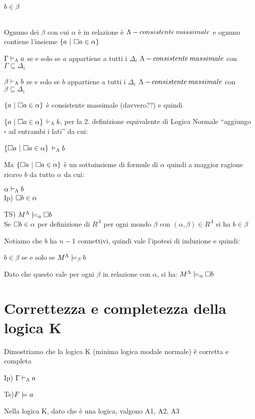 $b\in\beta$

 \\


Ognuno dei $\beta$ con cui $\alpha$ è in relazione è $\Lambda-consistente\: massimale$
e ognuno contiene l'insieme $\{a\ |\ \boa\in\alpha\}$ 

$\Gamma\vdash_{\Lambda}a$ se e solo se $a$ appartiene a tutti i $\Delta_{i}$
$\Lambda-consistente\: massimale$ con $\Gamma\subseteq\Delta_{i}$

$\beta\vdash_{\Lambda}b$ se e solo se $b$ appartiene a tutti i $\Delta_{i}$
$\Lambda-consistente\: massimale$ con $\beta\subseteq\Delta_{i}$

$\{a\ |\ \boa\in\alpha\}$ è consistente massimale (davvero??) e quindi

$\{a\ |\ \boa\in\alpha\}$ $\vdash_{\Lambda}b$, per la 2. definizione equivalente
di Logica Normale ``aggiungo $\square$ ad entrambi i lati'' da
cui:

$\{\square a\ |\ \square a\in\alpha\}$ $\vdash_{\Lambda}b$

Ma $\{\square a\ |\ \square a\in\alpha\}$ è un sottoinsieme di formule di $\alpha$
quindi a maggior ragione ricavo $b$ da tutto $\alpha$ da cui:

$\alpha\vdash_{\Lambda}b$\\
Ip) $\square b\in\alpha$

TS) $M^{\Lambda}\models_{\alpha}\square b$\\
Se $\square b\in\alpha$ per definizione di $R^{\Lambda}$ per ogni
mondo $\beta$ con $(\alpha,\beta)\in R^{\Lambda}$ si ha $b\in\beta$

Notiamo che $b$ ha $n-1$ connettivi, quindi vale l'ipotesi di induzione
e quindi:

$ $$b\in\beta$ se e solo se $M^{\Lambda}\models_{\beta}b$

Dato che questo vale $ $per ogni $\beta$ in relazione con $\alpha$,
si ha: $M^{\Lambda}\models_{\alpha}\square b$


\section{$ $Correttezza e completezza della logica K}

Dimostriamo che la logica K (minima logica modale normale) è corretta
e completa

Ip) $\Gamma\vdash_{\Lambda}a$ 

Ts)$F\models a$

Nella logica K, dato che è una logica, valgono A1, A2, A3
